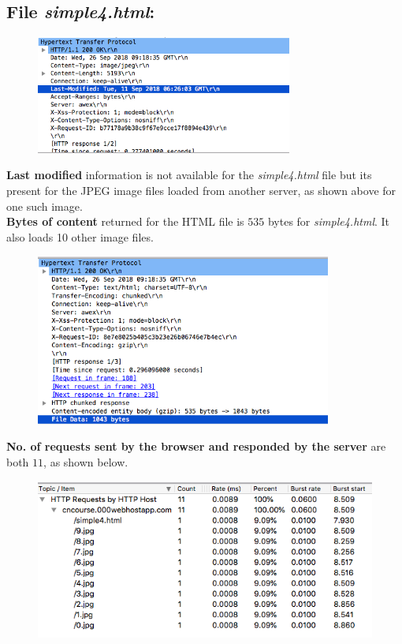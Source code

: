 \documentclass[]{report}
\begin{document}
\subsection{File \textit{simple4.html}:}
\begin{figure}[H]
	\vspace{0pt}
	\includegraphics[height = 110pt, keepaspectratio]{Snapshots/q1/simple4/1_4_5.png}
\end{figure}
\textbf{Last modified} information is not available for the \textit{simple4.html} file but its present for the JPEG image files loaded from another server, as shown above for one such image. \\ 
\textbf{Bytes of content} returned for the HTML file is $535$ bytes for \textit{simple4.html}. It also loads 10 other image files.
\begin{figure}[H]
	\vspace{0pt}
	\includegraphics[height = 160pt, keepaspectratio]{Snapshots/q1/simple4/1_4_6.png}
\end{figure}
\textbf{No. of requests sent by the browser and responded by the server} are both $11$, as shown below. \\
\begin{figure}[H]
	\vspace{0pt}
	\includegraphics[height = 150pt, keepaspectratio]{Snapshots/q1/simple4/1_4_8.png}
\end{figure}
\end{document}

